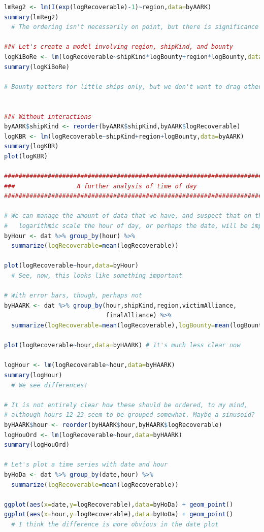 \documentclass[letterpaper,12pt,article]{memoir}
\begin{document}
{\begin{lstlisting}[language=R]
lmReg2 <- lm(I(exp(logRecoverable)-1)~region,data=byAARK)
summary(lmReg2)
  # The ordering isn't necessarily on point, but there is significance heres

### Let's create a model involving region, shipKind, and bounty
logKiBoRe <- lm(logRecoverable~shipKind*logBounty+region*logBounty,data=byAARK)
summary(logKiBoRe)

# Bounty matters for little ships only, but we don't want to drag others in


### Without interactions
byAARK$shipKind <- reorder(byAARK$shipKind,byAARK$logRecoverable)
logKBR <- lm(logRecoverable~shipKind+region+logBounty,data=byAARK)
summary(logKBR)
plot(logKBR)

###############################################################################
###                 A further analysis of time of day                       ###
###############################################################################

# We can manage the amount of data that we have, and suspect that on the
#   logarithmic scale the hour of day, or perhaps the date, will be important.
byHour <- dat %>% group_by(hour) %>% 
  summarize(logRecoverable=mean(logRecoverable))

plot(logRecoverable~hour,data=byHour)
  # See, now, this looks like something important

# With error bars, though, perhaps not
byHAARK <- dat %>% group_by(hour,shipKind,region,victimAlliance,
                            finalAlliance) %>%
  summarize(logRecoverable=mean(logRecoverable),logBounty=mean(logBounty))

plot(logRecoverable~hour,data=byHAARK) # It's much less clear now

logHour <- lm(logRecoverable~hour,data=byHAARK)
summary(logHour)
  # We see differences!

# It is not entirely clear how these should be ordered, to my mind,
# although hours 12-23 seem to be grouped somewhat. Maybe a sinusoid?
byHAARK$hour <- reorder(byHAARK$hour,byHAARK$logRecoverable)
logHouOrd <- lm(logRecoverable~hour,data=byHAARK)
summary(logHouOrd)

# Let's plot a time series with date and hour
byHoDa <- dat %>% group_by(date,hour) %>%
  summarize(logRecoverable=mean(logRecoverable))

ggplot(aes(x=date,y=logRecoverable),data=byHoDa) + geom_point()
ggplot(aes(x=hour,y=logRecoverable),data=byHoDa) + geom_point()
  # I think the difference is more obvious in the date plot


\end{lstlisting}}
\end{document}
